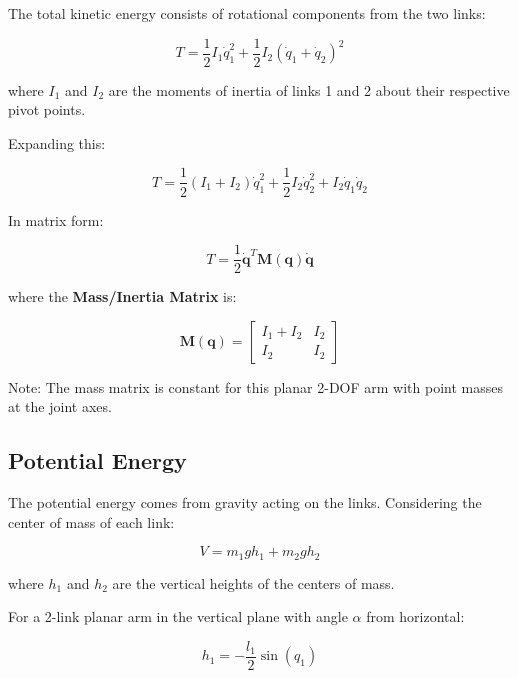 The total kinetic energy consists of rotational components from the two links:

\begin{equation}
T = \frac{1}{2} I_1 \dot{q}_1^2 + \frac{1}{2} I_2 (\dot{q}_1 + \dot{q}_2)^2
\end{equation}

where $I_1$ and $I_2$ are the moments of inertia of links 1 and 2 about their respective pivot points.

Expanding this:

\begin{equation}
T = \frac{1}{2} (I_1 + I_2) \dot{q}_1^2 + \frac{1}{2} I_2 \dot{q}_2^2 + I_2 \dot{q}_1 \dot{q}_2
\end{equation}

In matrix form:

\begin{equation}
T = \frac{1}{2} \dot{\mathbf{q}}^T \mathbf{M}(\mathbf{q}) \dot{\mathbf{q}}
\end{equation}

where the \textbf{Mass/Inertia Matrix} is:

\begin{equation}
\mathbf{M}(\mathbf{q}) = \begin{bmatrix}
I_1 + I_2 & I_2 \\
I_2 & I_2
\end{bmatrix}
\end{equation}

Note: The mass matrix is constant for this planar 2-DOF arm with point masses at the joint axes.

\subsection{Potential Energy}

The potential energy comes from gravity acting on the links. Considering the center of mass of each link:

\begin{equation}
V = m_1 g h_1 + m_2 g h_2
\end{equation}

where $h_1$ and $h_2$ are the vertical heights of the centers of mass.

For a 2-link planar arm in the vertical plane with angle $\alpha$ from horizontal:

\begin{equation}
h_1 = -\frac{l_1}{2} \sin(q_1)
\end{equation}

